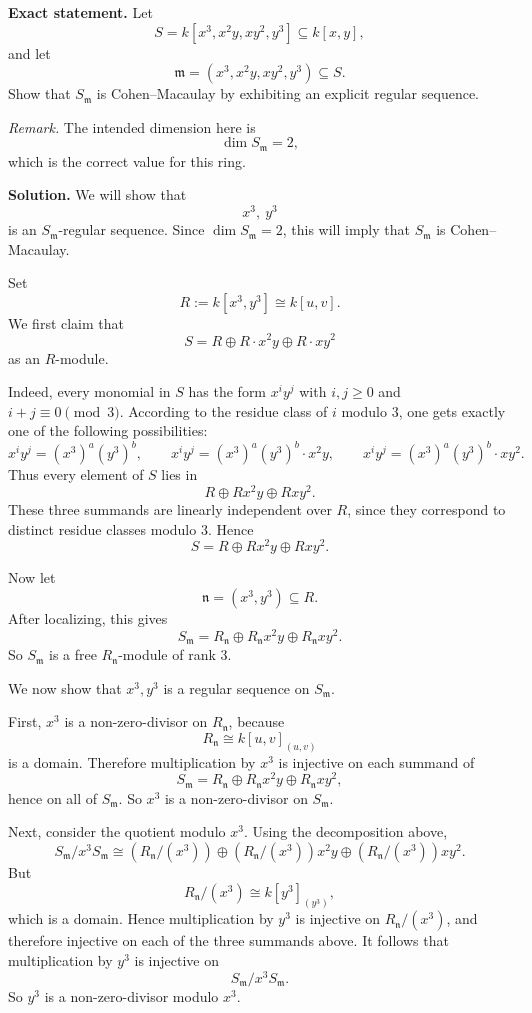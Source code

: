 \documentclass[12pt,a4paper,oneside]{report}
\theoremstyle{notespace}
\begin{document}
\textbf{Exact statement.}
Let
\[
S=k[x^3,x^2y,xy^2,y^3]\subseteq k[x,y],
\]
and let
\[
\mathfrak m=(x^3,x^2y,xy^2,y^3)\subseteq S.
\]
Show that \(S_{\mathfrak m}\) is Cohen--Macaulay by exhibiting an explicit regular sequence.

\medskip

\textit{Remark.} The intended dimension here is
\[
\dim S_{\mathfrak m}=2,
\]
which is the correct value for this ring.

\textbf{Solution.}
We will show that
\[
x^3,\ y^3
\]
is an \(S_{\mathfrak m}\)-regular sequence. Since \(\dim S_{\mathfrak m}=2\), this will imply that \(S_{\mathfrak m}\) is Cohen--Macaulay.

\medskip

Set
\[
R:=k[x^3,y^3]\cong k[u,v].
\]
We first claim that
\[
S=R\oplus R\cdot x^2y \oplus R\cdot xy^2
\]
as an \(R\)-module.

Indeed, every monomial in \(S\) has the form \(x^i y^j\) with \(i,j\ge 0\) and \(i+j\equiv 0\pmod 3\). According to the residue class of \(i\) modulo \(3\), one gets exactly one of the following possibilities:
\[
x^i y^j=(x^3)^a(y^3)^b,
\qquad
x^i y^j=(x^3)^a(y^3)^b\cdot x^2y,
\qquad
x^i y^j=(x^3)^a(y^3)^b\cdot xy^2.
\]
Thus every element of \(S\) lies in
\[
R\oplus R x^2y \oplus R xy^2.
\]
These three summands are linearly independent over \(R\), since they correspond to distinct residue classes modulo \(3\). Hence
\[
S=R\oplus R x^2y \oplus R xy^2.
\]

Now let
\[
\mathfrak n=(x^3,y^3)\subseteq R.
\]
After localizing, this gives
\[
S_{\mathfrak m}
=
R_{\mathfrak n}\oplus R_{\mathfrak n}x^2y \oplus R_{\mathfrak n}xy^2.
\]
So \(S_{\mathfrak m}\) is a free \(R_{\mathfrak n}\)-module of rank \(3\).

\medskip

We now show that \(x^3,y^3\) is a regular sequence on \(S_{\mathfrak m}\).

First, \(x^3\) is a non-zero-divisor on \(R_{\mathfrak n}\), because
\[
R_{\mathfrak n}\cong k[u,v]_{(u,v)}
\]
is a domain. Therefore multiplication by \(x^3\) is injective on each summand of
\[
S_{\mathfrak m}
=
R_{\mathfrak n}\oplus R_{\mathfrak n}x^2y \oplus R_{\mathfrak n}xy^2,
\]
hence on all of \(S_{\mathfrak m}\). So \(x^3\) is a non-zero-divisor on \(S_{\mathfrak m}\).

Next, consider the quotient modulo \(x^3\). Using the decomposition above,
\[
S_{\mathfrak m}/x^3S_{\mathfrak m}
\cong
(R_{\mathfrak n}/(x^3)) \oplus (R_{\mathfrak n}/(x^3))x^2y \oplus (R_{\mathfrak n}/(x^3))xy^2.
\]
But
\[
R_{\mathfrak n}/(x^3)
\cong
k[y^3]_{(y^3)},
\]
which is a domain. Hence multiplication by \(y^3\) is injective on \(R_{\mathfrak n}/(x^3)\), and therefore injective on each of the three summands above. It follows that multiplication by \(y^3\) is injective on
\[
S_{\mathfrak m}/x^3S_{\mathfrak m}.
\]
So \(y^3\) is a non-zero-divisor modulo \(x^3\).
\end{document}
